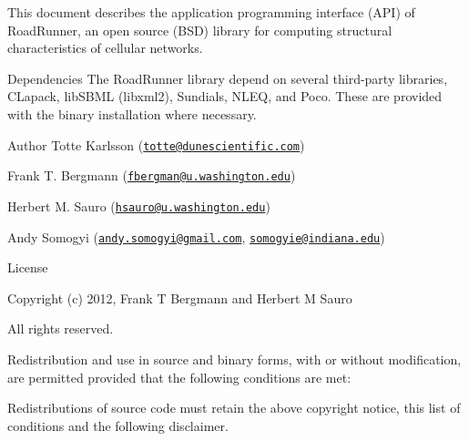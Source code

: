 \begin{DoxyParagraph}{}
This document describes the application programming interface (A\-P\-I) of Road\-Runner, an open source (B\-S\-D) library for computing structural characteristics of cellular networks. 
\end{DoxyParagraph}
\begin{DoxyParagraph}{}

\end{DoxyParagraph}
\begin{DoxyParagraph}{Dependencies}
The Road\-Runner library depend on several third-\/party libraries, C\-Lapack, lib\-S\-B\-M\-L (libxml2), Sundials, N\-L\-E\-Q, and Poco. These are provided with the binary installation where necessary. 
\end{DoxyParagraph}
\begin{DoxyParagraph}{}

\end{DoxyParagraph}
\begin{DoxyAuthor}{Author}
Totte Karlsson (\href{mailto:totte@dunescientific.com}{\tt totte@dunescientific.\-com}) 

Frank T. Bergmann (\href{mailto:fbergman@u.washington.edu}{\tt fbergman@u.\-washington.\-edu}) 

Herbert M. Sauro (\href{mailto:hsauro@u.washington.edu}{\tt hsauro@u.\-washington.\-edu}) 

Andy Somogyi (\href{mailto:andy.somogyi@gmail.com}{\tt andy.\-somogyi@gmail.\-com}, \href{mailto:somogyie@indiana.edu}{\tt somogyie@indiana.\-edu})
\end{DoxyAuthor}
\begin{DoxyParagraph}{License}

\end{DoxyParagraph}
\begin{DoxyParagraph}{}
Copyright (c) 2012, Frank T Bergmann and Herbert M Sauro\par
All rights reserved.
\end{DoxyParagraph}
\begin{DoxyParagraph}{}
Redistribution and use in source and binary forms, with or without modification, are permitted provided that the following conditions are met\-:
\end{DoxyParagraph}
\begin{DoxyItemize}
\item Redistributions of source code must retain the above copyright notice, this list of conditions and the following disclaimer.\end{DoxyItemize}
